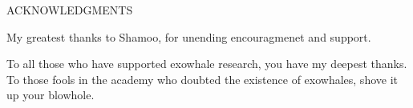 \begin{center}
ACKNOWLEDGMENTS
\end{center}

My greatest thanks to Shamoo, for unending encouragmenet and support.

To all those who have supported exowhale research, you have my deepest thanks. To those fools in the academy who doubted the existence of exowhales, shove it up your blowhole.